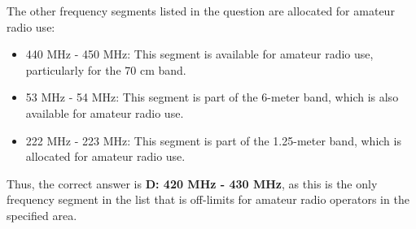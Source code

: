 The other frequency segments listed in the question are allocated for amateur radio use:
\begin{itemize}
    \item 440 MHz - 450 MHz: This segment is available for amateur radio use, particularly for the 70 cm band.
    \item 53 MHz - 54 MHz: This segment is part of the 6-meter band, which is also available for amateur radio use.
    \item 222 MHz - 223 MHz: This segment is part of the 1.25-meter band, which is allocated for amateur radio use.
\end{itemize}

Thus, the correct answer is \textbf{D: 420 MHz - 430 MHz}, as this is the only frequency segment in the list that is off-limits for amateur radio operators in the specified area.

